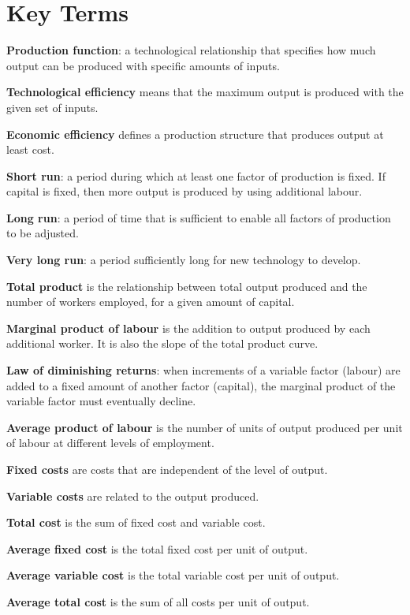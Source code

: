 \newpage
	\section*{Key Terms}
\begin{keyterms}
\textbf{Production function}: a technological relationship that specifies how much output can be produced with specific amounts of inputs.

\textbf{Technological efficiency} means that the maximum output is produced with the given set of inputs.

\textbf{Economic efficiency} defines a production structure that produces output at least cost.

\textbf{Short run}: a period during which at least one factor of production is fixed. If capital is fixed, then more output is produced by using additional labour.

\textbf{Long run}: a period of time that is sufficient to enable all factors of production to be adjusted.

\textbf{Very long run}: a period sufficiently long for new technology to develop.

\textbf{Total product} is the relationship between total output produced and the number of workers employed, for a given amount of capital.

\textbf{Marginal product of labour} is the addition to output produced by each additional worker. It is also the slope of the total product curve.

\textbf{Law of diminishing returns}: when increments of a variable factor (labour) are added to a fixed amount of another factor (capital), the marginal product of the variable factor must eventually decline.

\textbf{Average product of labour} is the number of units of output produced per unit of labour at different levels of employment.

\textbf{Fixed costs} are costs that are independent of the level of output.

\textbf{Variable costs} are related to the output produced.

\textbf{Total cost} is the sum of fixed cost and variable cost.

\textbf{Average fixed cost} is the total fixed cost per unit of output.

\textbf{Average variable cost} is the total variable cost per unit of output.

\textbf{Average total cost} is the sum of all costs per unit of output.


\end{keyterms}
